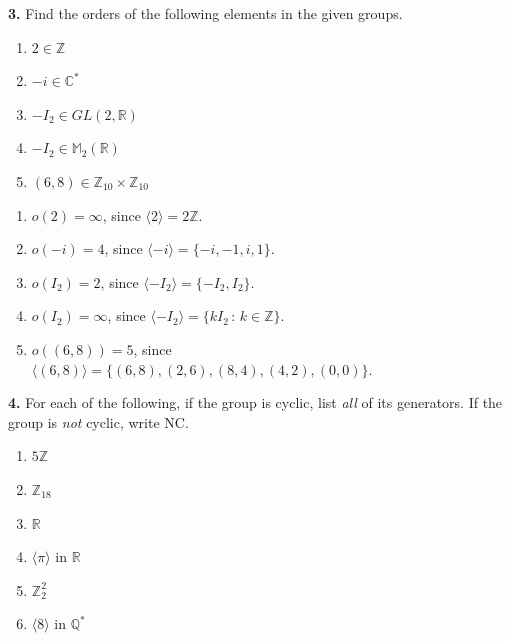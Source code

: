 \documentclass[10pt,]{book}
\theoremstyle{plain}
\theoremstyle{definition}
\theoremstyle{definition}
\theoremstyle{definition}
\theoremstyle{definition}
\numberwithin{equation}{section}
\def\Z{\mathbb{Z}}
\def\R{\mathbb{R}}
\def\Q{\mathbb{Q}}
\def\C{\mathbb{C}}
\def\M{\mathbb{M}}
\begin{document}
\par\smallskip
\noindent\textbf{3.}\quad{}
        Find the orders of the following elements in the given groups.
        \leavevmode%
\begin{enumerate}[label=(\alph*)]
\item\hypertarget{li-283}{}
              \(2\in \Z\)
\item\hypertarget{li-284}{}
              \(-i\in \C^*\)
 
\item\hypertarget{li-285}{}
              \(-I_2\in GL(2,\R)\)
\item\hypertarget{li-286}{}
              \(-I_2\in \M_2(\R)\)
\item\hypertarget{li-287}{}
              \((6,8)\in \Z_{10}\times \Z_{10}\)
\end{enumerate}

\par\smallskip
\leavevmode%
\begin{enumerate}[label=(\alph*)]
\item\hypertarget{li-288}{}
          \(o(2)=\infty\), since \(\langle 2\rangle =2\Z\).
\item\hypertarget{li-289}{}
          \(o(-i)=4\), since \(\langle -i\rangle =\{-i,-1,i,1\}\).
\item\hypertarget{li-290}{}
          \(o(I_2)=2\), since \(\langle -I_2\rangle =\{-I_2,I_2\}\).
\item\hypertarget{li-291}{}
          \(o(I_2)=\infty\), since \(\langle -I_2\rangle =\{kI_2\,:\,k\in \Z\}\).
\item\hypertarget{li-292}{}
          \(o((6,8))=5\), since \(\langle (6,8)\rangle =\{(6,8),(2,6),(8,4),(4,2),(0,0)\}\).
\end{enumerate}
\par\smallskip
\noindent\textbf{4.}\quad{}
        For each of the following, if the group is cyclic, list \emph{all} of its generators. If the group is \emph{not} cyclic, write NC.
        \leavevmode%
\begin{enumerate}[label=(\alph*)]
\item\hypertarget{li-293}{}
              \(5\Z\)
\item\hypertarget{li-294}{}
              \(\Z_{18}\)
\item\hypertarget{li-295}{}
              \(\R\)
\item\hypertarget{li-296}{}
              \(\langle \pi\rangle\) in \(\R\)
\item\hypertarget{li-297}{}
              \(\Z_2^2\)
\item\hypertarget{li-298}{}
              \(\langle 8\rangle\) in \(\Q^*\)
\end{enumerate}
\end{document}
